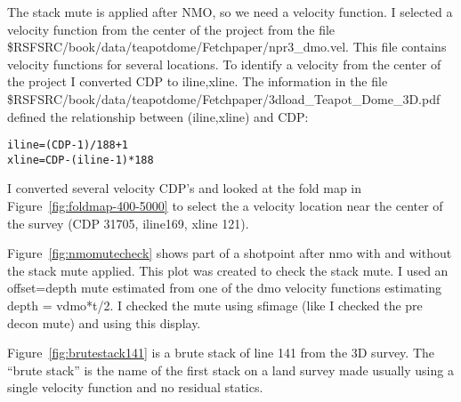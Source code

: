 The stack mute is applied after NMO, so we need a velocity function.  I selected a velocity function from the center of the project from the file \$RSFSRC/book/data/teapotdome/Fetchpaper/npr3\_dmo.vel. This file contains velocity functions for several locations.  To identify a velocity from the center of the project I converted CDP to iline,xline.  The information in the file  \$RSFSRC/book/data/teapotdome/Fetchpaper/3dload\_Teapot\_Dome\_3D.pdf defined the relationship between (iline,xline) and CDP:

\begin{verbatim}  
iline=(CDP-1)/188+1
xline=CDP-(iline-1)*188
\end{verbatim}  

I converted several velocity CDP’s and looked at the fold map in Figure~\ref{fig:foldmap-400-5000} to select the a velocity location near the center of the survey (CDP 31705, iline169, xline 121).

Figure~\ref{fig:nmomutecheck} shows part of a shotpoint after nmo with and without the stack mute applied.  This plot was created to check the stack mute.  I used an offset=depth mute estimated from one of the dmo velocity functions estimating depth = vdmo*t/2.   I checked the mute using sfimage (like I checked the pre decon mute) and using this display.

Figure~\ref{fig:brutestack141} is a brute stack of line 141 from the 3D survey.  The “brute stack” is the name of the first stack on a land survey made usually using a single velocity function and no residual statics.






